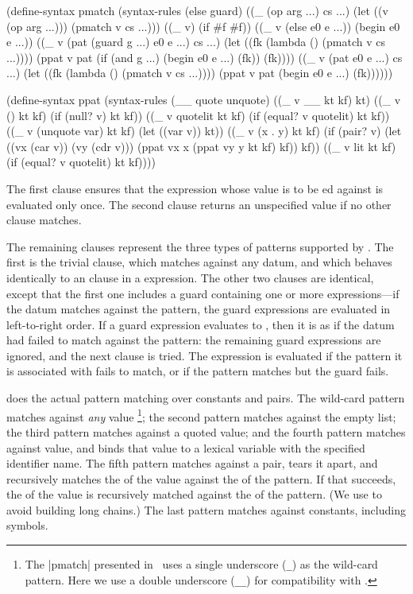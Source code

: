 \begin{schemedisplay}
(define-syntax pmatch
  (syntax-rules (else guard)
    ((_ (op arg ...) cs ...)
     (let ((v (op arg ...)))
       (pmatch v cs ...)))
    ((_ v) (if #f #f))
    ((_ v (else e0 e ...)) (begin e0 e ...))
    ((_ v (pat (guard g ...) e0 e ...) cs ...)
     (let ((fk (lambda () (pmatch v cs ...))))
       (ppat v pat 
         (if (and g ...) (begin e0 e ...) (fk))
         (fk))))
    ((_ v (pat e0 e ...) cs ...)
     (let ((fk (lambda () (pmatch v cs ...))))
       (ppat v pat (begin e0 e ...) (fk))))))

(define-syntax ppat
  (syntax-rules (__ quote unquote)
    ((_ v __ kt kf) kt)
    ((_ v () kt kf) (if (null? v) kt kf))
    ((_ v quotelit kt kf)
     (if (equal? v quotelit) kt kf))
    ((_ v (unquote var) kt kf) (let ((var v)) kt))
    ((_ v (x . y) kt kf)
     (if (pair? v)
       (let ((vx (car v)) (vy (cdr v)))
         (ppat vx x (ppat vy y kt kf) kf))
       kf))
    ((_ v lit kt kf) (if (equal? v quotelit) kt kf))))
\end{schemedisplay}

The first clause ensures that the expression whose value is to be
ed against is evaluated only once.  The second clause
returns an unspecified value if no other clause matches.

The remaining clauses represent the three types of patterns supported
by .  The first is the trivial  clause,
which matches against any datum, and which behaves identically to an
 clause in a  expression.  The other two
clauses are identical, except that the first one includes a guard
containing one or more expressions---if the datum matches against the
pattern, the guard expressions are evaluated in left-to-right order.
If a guard expression evaluates to , then it is as if the
datum had failed to match against the pattern: the remaining guard
expressions are ignored, and the next clause is tried.
The expression  is evaluated if the pattern it is
associated with fails to match, or if the pattern matches but the
guard fails.

 does the actual pattern matching over constants and
pairs. The wild-card pattern \scheme{__} matches against \emph{any} value%
\footnote{The \scheme|pmatch| presented in~\cite{alphamk} uses a single underscore ({\tt \_}) as the wild-card pattern. Here we use a double underscore ({\tt \_\_}) for compatibility with \RsixRS.};
the second pattern matches against the empty list;
the third pattern matches against a quoted value; and
the fourth pattern matches against  value, 
and binds that value to a lexical variable with the specified identifier name.  
The fifth pattern matches against a pair, tears it apart, 
and recursively matches the  of the value against
the  of the pattern.  If that succeeds, the  
of the value is recursively matched against the  of the pattern.  
(We use  to avoid building long  chains.)
The last pattern matches against constants, including symbols.

